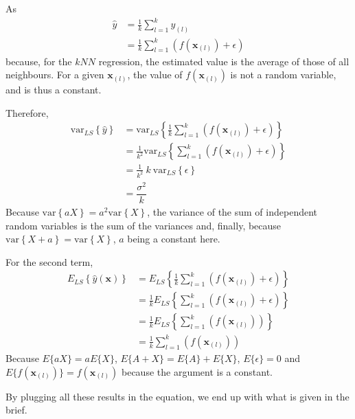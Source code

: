 As
\begin{align*}
    \hat{y} &= \frac{1}{k} \sum_{l=1}^k y_{(l)}\\
    &= \frac{1}{k} \sum_{l=1}^k \left(f(\mathbf{x}_{(l)})+\epsilon\right)
\end{align*}
because, for the $kNN$ regression, the estimated value is the average of those of all neighbours. For a given $\mathbf{x}_{(l)}$, the value of $f(\mathbf{x}_{(l)})$ is not a random variable, and is thus a constant.\par
Therefore,
\begin{align*}
    \text{var}_{L S}\left\{ \hat{y} \right\} &= \text{var}_{L S}\left\{ \frac{1}{k} \sum_{l=1}^k \left(f(\mathbf{x}_{(l)})+\epsilon\right) \right\}\\
    &= \frac{1}{k^2} \text{var}_{L S}\left\{\sum_{l=1}^k \left(f(\mathbf{x}_{(l)})+\epsilon\right) \right\}\\
    &= \frac{1}{k^2} \ k\ \text{var}_{L S}\left\{ \epsilon \right\}\\
    &= \dfrac{\sigma^2}{k}
\end{align*}
Because $\text{var}\left\{ a X \right\} = a^2 \text{var}\left\{ X \right\}$, the variance of the sum of independent random variables is the sum of the variances and, finally, because $\text{var}\left\{ X + a \right\} = \text{var}\left\{ X \right\}$, $a$ being a constant here.\par
For the second term,
\begin{align*}
    E_{L S}\left\{\hat{y}(\mathbf{x})\right\} &= E_{L S}\left\{ \frac{1}{k} \sum_{l=1}^k \left(f(\mathbf{x}_{(l)})+\epsilon\right) \right\}\\
    &= \frac{1}{k} E_{L S}\left\{\sum_{l=1}^k \left(f(\mathbf{x}_{(l)})+\epsilon\right) \right\}\\
    &= \frac{1}{k} E_{L S}\left\{\sum_{l=1}^k \left(f(\mathbf{x}_{(l)})\right) \right\}\\
    &= \frac{1}{k} \sum_{l=1}^k \left(f(\mathbf{x}_{(l)})\right)
\end{align*}
Because $E\{aX\} = aE\{X\}$, $E\{A+X\} = E\{A\} + E\{X\}$, $E\{\epsilon\} = 0$ and $E\{f(\mathbf{x}_{(l)})\} = f(\mathbf{x}_{(l)})$ because the argument is a constant.\par
By plugging all these results in the equation, we end up with what is given in the brief.
